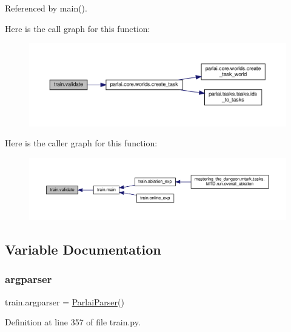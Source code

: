 Referenced by main().

Here is the call graph for this function\+:
\nopagebreak
\begin{figure}[H]
\begin{center}
\leavevmode
\includegraphics[width=350pt]{namespacetrain_a339ec8fa7ecbd096bb08716bd0b2aa94_cgraph}
\end{center}
\end{figure}
Here is the caller graph for this function\+:
\nopagebreak
\begin{figure}[H]
\begin{center}
\leavevmode
\includegraphics[width=350pt]{namespacetrain_a339ec8fa7ecbd096bb08716bd0b2aa94_icgraph}
\end{center}
\end{figure}


\subsection{Variable Documentation}
\mbox{\label{namespacetrain_a674f48668d3e343c9b06b0b72ca8c458}} 
\subsubsection{\texorpdfstring{argparser}{argparser}}
{\footnotesize\ttfamily train.\+argparser = \hyperlink{classparlai_1_1core_1_1params_1_1ParlaiParser}{Parlai\+Parser}()}



Definition at line 357 of file train.\+py.

\mbox{\label{namespacetrain_ac0b1ba6aa4860ceedd16f937406545c7}} 
